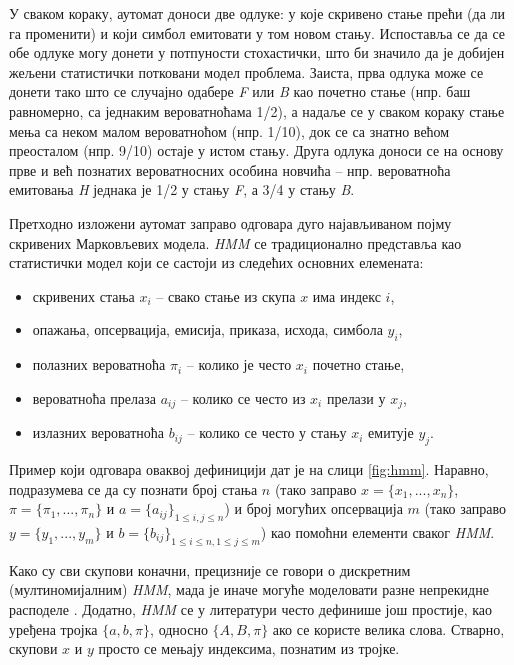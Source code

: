 \documentclass[12pt,oneside]{memoir}
\begin{document}
\begin{CJK}{UTF8}{ipxm}
У сваком кораку, аутомат доноси две одлуке: у које скривено стање прећи (да ли га променити) и који симбол емитовати у том новом стању. Испоставља се да се обе одлуке могу донети у потпуности стохастички, што би значило да је добијен жељени статистички потковани модел проблема. Заиста, прва одлука може се донети тако што се случајно одабере \textit{F} или \textit{B} као почетно стање (нпр. баш равномерно, са једнаким вероватноћама 1/2), а надаље се у сваком кораку стање мења са неком малом вероватноћом (нпр. 1/10), док се са знатно већом преосталом (нпр. 9/10) остаје у истом стању. Друга одлука доноси се на основу прве и већ познатих вероватносних особина новчића -- нпр. вероватноћа емитовања \textit{H} једнака је 1/2 у стању \textit{F}, а 3/4 у стању \textit{B}.

Претходно изложени аутомат заправо одговара дуго најављиваном појму скривених Марковљевих модела. \textit{HMM} се традиционално представља као статистички модел који се састоји из следећих основних елемената:
\begin{itemize}
  \item скривених стања $x_i$ -- свако стање из скупа $x$ има индекс $i$,
  \item опажања, опсервација, емисија, приказа, исхода, симбола $y_i$,
  \item полазних вероватноћа $\pi_i$ -- колико је често $x_i$ почетно стање,
  \item вероватноћа прелаза $a_{ij}$ -- колико се често из $x_i$ прелази у $x_j$,
  \item излазних вероватноћа $b_{ij}$ -- колико се често у стању $x_i$ емитује $y_j$.
\end{itemize}
Пример који одговара оваквој дефиницији дат је на слици \ref{fig:hmm}. Наравно, подразумева се да су познати број стања $n$ (тако заправо $x = \{x_1, ..., x_n\}$, $\pi = \{\pi_1, ..., \pi_n\}$ и $a = \{a_{ij}\}_{1 \leq i, j \leq n}$) и број могућих опсервација $m$ (тако заправо $y = \{y_1, ..., y_m\}$ и $b = \{b_{ij}\}_{1 \leq i \leq n, 1 \leq j \leq m}$) као помоћни елементи сваког \textit{HMM}.

Како су сви скупови коначни, прецизније се говори о дискретним (мултиномијалним) \textit{HMM}, мада је иначе могуће моделовати разне непрекидне расподеле \cite{jordan2004}. Додатно, \textit{HMM} се у литератури често дефинише још простије, као уређена тројка $\{a, b, \pi\}$, односно $\{A, B, \pi\}$ ако се користе велика слова. Стварно, скупови $x$ и $y$ просто се мењају индексима, познатим из тројке.


\end{CJK}
\end{document}
